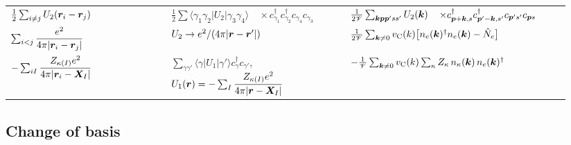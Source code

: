 \begin{table}[tbp]
\begin{tabular}{@{}p{0.27\linewidth}p{0.30\linewidth}p{0.37\linewidth}@{}}
    $\tfrac12\sum_{i\ne j}U_2(\bm{r}_i - \bm{r}_j)$ & $\tfrac12\sum\langle\gamma_1\gamma_2|U_2|\gamma_3\gamma_4\rangle$\newline$\quad\times c^\dagger_{\gamma_1}c^\dagger_{\gamma_2}c_{\gamma_4}c_{\gamma_3}$ & $\tfrac1{2\mathscr{V}}\sum_{\bm{k}\bm{p}\bm{p}'ss'}U_2(\bm{k})$\newline$\quad\times c^\dagger_{\bm{p}+\bm{k},s}c^\dagger_{\bm{p}'-\bm{k},s'}c_{\bm{p}'s'}c_{\bm{p}s}$ \\
    $\sum_{i<j}\dfrac{e^2}{4\pi|\bm{r}_i - \bm{r}_j|}$ & $U_2 \to e^2/(4\pi|\bm{r} - \bm{r}'|)$ & $\tfrac1{2\mathscr{V}}\sum_{\bm{k}\ne0}v_{\mathrm{C}}(k)\bigl[n_e(\bm{k})^\dagger n_e(\bm{k}) - \hat{N}_e\bigr]$ \\
    $-\sum_{iI}\dfrac{Z_{\kappa(I)}e^2}{4\pi|\bm{r}_i - \bm{X}_I|}$ & $\sum_{\gamma\gamma'}\langle\gamma|U_1|\gamma'\rangle c^\dagger_\gamma c_{\gamma'}$, $U_1(\bm{r}) = -\sum_I\dfrac{Z_{\kappa(I)}e^2}{4\pi|\bm{r} - \bm{X}_I|}$ & $-\tfrac1{\mathscr{V}}\sum_{\bm{k}\ne0}v_{\mathrm{C}}(k)\sum_\kappa Z_\kappa\,n_\kappa(\bm{k})\,n_e(\bm{k})^\dagger$ \\
    \bottomrule
  \end{tabular}
\end{table}

\subsection{Change of basis}

